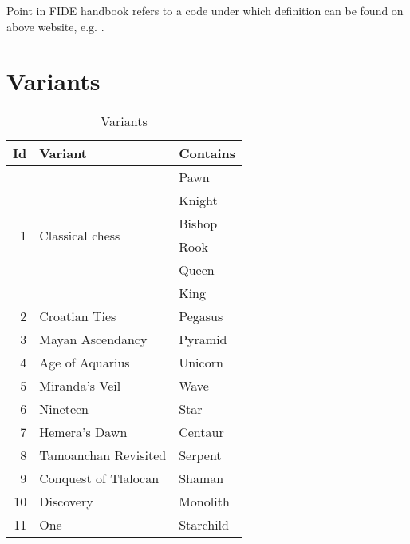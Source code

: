 Point in FIDE handbook refers to a code under which definition can be found on above website,
e.g. .

\clearpage %

\section*{Variants}
\label{sec:Appendix/Variants}

\begin{table}[!h]
\centering
\begin{tabular}{ rll }
\toprule
\textbf{Id} & \textbf{Variant} & \textbf{Contains}                  \\
\midrule
\multirow{6}{*}{1} & \multirow{6}{*}{Classical chess} & Pawn        \\
                   &                                  & Knight      \\
                   &                                  & Bishop      \\
                   &                                  & Rook        \\
                   &                                  & Queen       \\
                   &                                  & King        \\ \cmidrule{1-3}
                 2 & Croatian Ties                    & Pegasus     \\
                 3 & Mayan Ascendancy                 & Pyramid     \\
                 4 & Age of Aquarius                  & Unicorn     \\
                 5 & Miranda's Veil                   & Wave        \\
                 6 & Nineteen                         & Star        \\
                 7 & Hemera's Dawn                    & Centaur     \\
                 8 & Tamoanchan Revisited             & Serpent     \\
                 9 & Conquest of Tlalocan             & Shaman      \\
                10 & Discovery                        & Monolith    \\
                11 & One                              & Starchild   \\
\bottomrule
\end{tabular}
\caption{Variants}
\label{tbl:Appendix/Variants}
\end{table}

